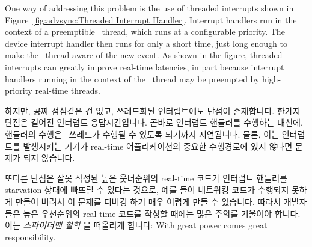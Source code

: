 One way of addressing this problem is the use of threaded interrupts shown in
Figure~\ref{fig:advsync:Threaded Interrupt Handler}.
Interrupt handlers run in the context of a preemptible \IRQ\ thread,
which runs at a configurable priority.
The device interrupt handler then runs for only a short time, just
long enough to make the \IRQ\ thread aware of the new event.
As shown in the figure, threaded interrupts can greatly improve
real-time latencies, in part because interrupt handlers running in
the context of the \IRQ\ thread may be preempted by high-priority real-time
threads.
\fi

하지만, 공짜 점심같은 건 없고, 쓰레드화된 인터럽트에도 단점이 존재합니다.
한가지 단점은 길어진 인터럽트 응답시간입니다.
곧바로 인터럽트 핸들러를 수행하는 대신에, 핸들러의 수행은 \IRQ\ 쓰레드가 수행될
수 있도록 되기까지 지연됩니다.
물론, 이는 인터럽트를 발생시키는 기기가 real-time 어플리케이션의 중요한
수행경로에 있지 않다면 문제가 되지 않습니다.

또다른 단점은 잘못 작성된 높은 웃너순위의 real-time 코드가 인터럽트 핸들러를
starvation 상태에 빠뜨릴 수 있다는 것으로, 예를 들어 네트워킹 코드가 수행되지
못하게 만들어 버려서 이 문제를 디버깅 하기 매우 어렵게 만들 수 있습니다.
따라서 개발자들은 높은 우선순위의 real-time 코드를 작성할 때에는 많은 주의를
기울여야 합니다.
이는 \emph{스파이더맨 철학} 을 떠올리게 합니다: With great power comes great
responsibility.

